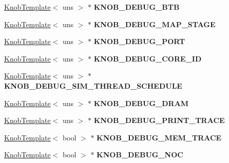 \begin{DoxyCompactItemize}
\item 
\hypertarget{classall__knobs__c_a6077fb633b1eee70fc602c12d9ff688c}{
\hyperlink{classKnobTemplate}{KnobTemplate}$<$ uns $>$ $\ast$ {\bfseries KNOB\_\-DEBUG\_\-BTB}}
\label{classall__knobs__c_a6077fb633b1eee70fc602c12d9ff688c}

\item 
\hypertarget{classall__knobs__c_abef390e5ac6701ed80cd0b9072d36586}{
\hyperlink{classKnobTemplate}{KnobTemplate}$<$ uns $>$ $\ast$ {\bfseries KNOB\_\-DEBUG\_\-MAP\_\-STAGE}}
\label{classall__knobs__c_abef390e5ac6701ed80cd0b9072d36586}

\item 
\hypertarget{classall__knobs__c_a2727476e9250b8e058a41b0e562e10e2}{
\hyperlink{classKnobTemplate}{KnobTemplate}$<$ uns $>$ $\ast$ {\bfseries KNOB\_\-DEBUG\_\-PORT}}
\label{classall__knobs__c_a2727476e9250b8e058a41b0e562e10e2}

\item 
\hypertarget{classall__knobs__c_ad4ca64e14e8e4befef1ccd883976f9b7}{
\hyperlink{classKnobTemplate}{KnobTemplate}$<$ uns $>$ $\ast$ {\bfseries KNOB\_\-DEBUG\_\-CORE\_\-ID}}
\label{classall__knobs__c_ad4ca64e14e8e4befef1ccd883976f9b7}

\item 
\hypertarget{classall__knobs__c_a44e074906d8df18f33dc5c20b79b80a9}{
\hyperlink{classKnobTemplate}{KnobTemplate}$<$ uns $>$ $\ast$ {\bfseries KNOB\_\-DEBUG\_\-SIM\_\-THREAD\_\-SCHEDULE}}
\label{classall__knobs__c_a44e074906d8df18f33dc5c20b79b80a9}

\item 
\hypertarget{classall__knobs__c_afbde1a462a94fe9d75c628d54dc8961e}{
\hyperlink{classKnobTemplate}{KnobTemplate}$<$ uns $>$ $\ast$ {\bfseries KNOB\_\-DEBUG\_\-DRAM}}
\label{classall__knobs__c_afbde1a462a94fe9d75c628d54dc8961e}

\item 
\hypertarget{classall__knobs__c_a6d970436b21b050357197b5af749883f}{
\hyperlink{classKnobTemplate}{KnobTemplate}$<$ uns $>$ $\ast$ {\bfseries KNOB\_\-DEBUG\_\-PRINT\_\-TRACE}}
\label{classall__knobs__c_a6d970436b21b050357197b5af749883f}

\item 
\hypertarget{classall__knobs__c_a73a762f9faed1016090c0cc0a620849d}{
\hyperlink{classKnobTemplate}{KnobTemplate}$<$ bool $>$ $\ast$ {\bfseries KNOB\_\-DEBUG\_\-MEM\_\-TRACE}}
\label{classall__knobs__c_a73a762f9faed1016090c0cc0a620849d}

\item 
\hypertarget{classall__knobs__c_a0ccc7a30733cc930603448da222028dd}{
\hyperlink{classKnobTemplate}{KnobTemplate}$<$ bool $>$ $\ast$ {\bfseries KNOB\_\-DEBUG\_\-NOC}}
\label{classall__knobs__c_a0ccc7a30733cc930603448da222028dd}


\end{DoxyCompactItemize}
